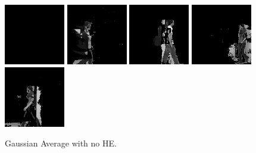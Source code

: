     \begin{subfigure}[t]{0.9\textwidth}
        \centering
        \includegraphics[scale=0.7]{figures/LASIESTA-PLAIN-GAUSSIAN/frame0}
        \hfill
        \includegraphics[scale=0.7]{figures/LASIESTA-PLAIN-GAUSSIAN/frame100}
        \hfill
        \includegraphics[scale=0.7]{figures/LASIESTA-PLAIN-GAUSSIAN/frame190}
        \hfill
        \includegraphics[scale=0.7]{figures/LASIESTA-PLAIN-GAUSSIAN/frame250}
        \hfill
        \includegraphics[scale=0.7]{figures/LASIESTA-PLAIN-GAUSSIAN/frame270}
        \caption{Gaussian Average with no HE.}
    \end{subfigure}
    \\ \bigskip

